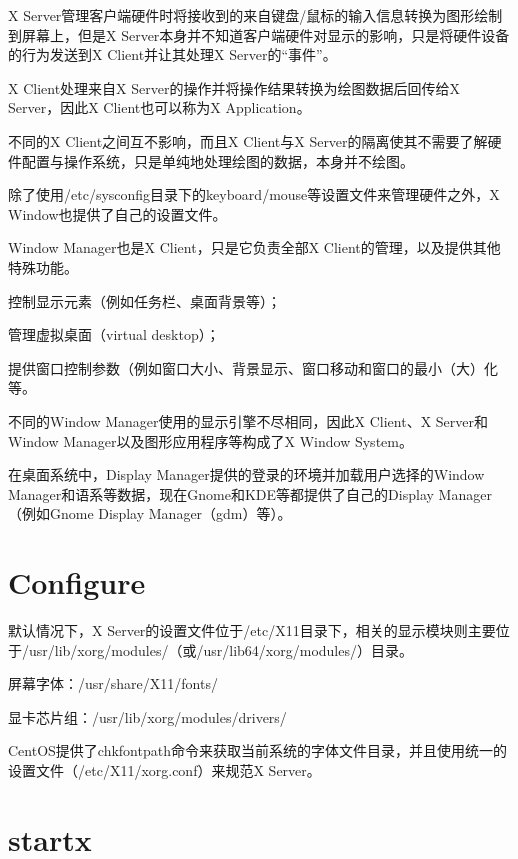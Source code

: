 X Server管理客户端硬件时将接收到的来自键盘/鼠标的输入信息转换为图形绘制到屏幕上，但是X Server本身并不知道客户端硬件对显示的影响，只是将硬件设备的行为发送到X Client并让其处理X Server的“事件”。

X Client处理来自X Server的操作并将操作结果转换为绘图数据后回传给X Server，因此X Client也可以称为X Application。

不同的X Client之间互不影响，而且X Client与X Server的隔离使其不需要了解硬件配置与操作系统，只是单纯地处理绘图的数据，本身并不绘图。

除了使用/etc/sysconfig目录下的keyboard/mouse等设置文件来管理硬件之外，X Window也提供了自己的设置文件。


Window Manager也是X Client，只是它负责全部X Client的管理，以及提供其他特殊功能。

\begin{compactitem}
\item 控制显示元素（例如任务栏、桌面背景等）；
\item 管理虚拟桌面（virtual desktop）；
\item 提供窗口控制参数（例如窗口大小、背景显示、窗口移动和窗口的最小（大）化等。
\end{compactitem}

不同的Window Manager使用的显示引擎不尽相同，因此X Client、X Server和Window Manager以及图形应用程序等构成了X Window System。

在桌面系统中，Display Manager提供的登录的环境并加载用户选择的Window Manager和语系等数据，现在Gnome和KDE等都提供了自己的Display Manager（例如Gnome Display Manager（gdm）等）。


\section{Configure}

默认情况下，X Server的设置文件位于/etc/X11目录下，相关的显示模块则主要位于/usr/lib/xorg/modules/（或/usr/lib64/xorg/modules/）目录。

\begin{compactitem}
\item 屏幕字体：/usr/share/X11/fonts/
\item 显卡芯片组：/usr/lib/xorg/modules/drivers/
\end{compactitem}

CentOS提供了chkfontpath命令来获取当前系统的字体文件目录，并且使用统一的设置文件（/etc/X11/xorg.conf）来规范X Server。

\section{startx}

